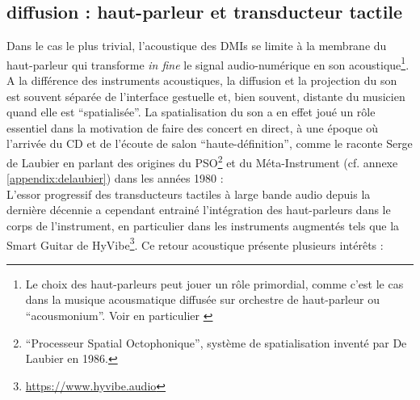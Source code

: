 \subsection{diffusion : haut-parleur et transducteur tactile}

\noindent Dans le cas le plus trivial, l'acoustique des \glspl{DMI} se limite à la membrane du haut-parleur qui transforme \textit{in fine} le signal audio-numérique en son acoustique\footnote{Le choix des haut-parleurs peut jouer un rôle primordial, comme c'est le cas dans la musique acousmatique diffusée sur orchestre de haut-parleur ou ``acousmonium''. Voir en particulier \cite{mooney_sound_2006}}. A la différence des instruments acoustiques, la diffusion et la projection du son est souvent séparée de l'interface gestuelle et, bien souvent, distante du musicien quand elle est ``spatialisée''. La spatialisation du son a en effet joué un rôle essentiel dans la motivation de faire des concert en direct, à une époque où l'arrivée du \gls{CD} et de l'écoute de salon ``haute-définition'', comme le raconte Serge de Laubier en parlant des origines du PSO\footnote{``Processeur Spatial Octophonique'', système de spatialisation inventé par De Laubier en 1986.} et du Méta-Instrument (cf. annexe \ref{appendix:delaubier}) dans les années 1980 : \\
\indent L'essor progressif des transducteurs tactiles à large bande audio depuis la dernière décennie a cependant entrainé l'intégration des haut-parleurs dans le corps de l'instrument, en particulier dans les instruments augmentés tels que la Smart Guitar de HyVibe\footnote{\url{https://www.hyvibe.audio}}. Ce retour acoustique présente plusieurs intérêts :


